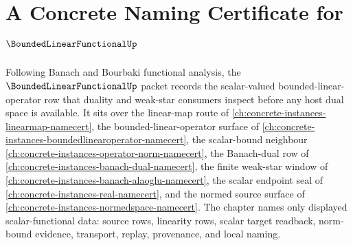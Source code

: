 \chapter{A Concrete Naming Certificate for $\BoundedLinearFunctionalUp$}
\label{ch:concrete-instances-bounded-linear-functional-namecert}

Following Banach and Bourbaki functional analysis, the $\BoundedLinearFunctionalUp$ packet records the scalar-valued bounded-linear-operator row that duality and weak-star consumers inspect before any host dual space is available. It sits over the linear-map route of \autoref{ch:concrete-instances-linearmap-namecert}, the bounded-linear-operator surface of \autoref{ch:concrete-instances-boundedlinearoperator-namecert}, the scalar-bound neighbour \autoref{ch:concrete-instances-operator-norm-namecert}, the Banach-dual row of \autoref{ch:concrete-instances-banach-dual-namecert}, the finite weak-star window of \autoref{ch:concrete-instances-banach-alaoglu-namecert}, the scalar endpoint seal of \autoref{ch:concrete-instances-real-namecert}, and the normed source surface of \autoref{ch:concrete-instances-normedspace-namecert}. The chapter names only displayed scalar-functional data: source rows, linearity rows, scalar target readback, norm-bound evidence, transport, replay, provenance, and local naming.

